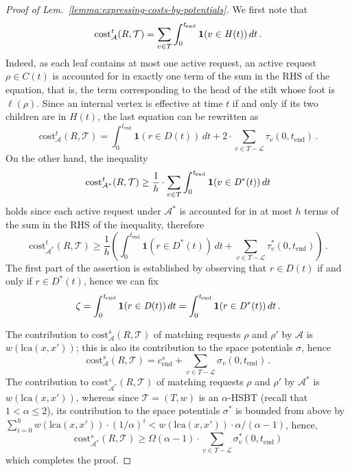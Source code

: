 \documentclass[11pt]{article}
\theoremstyle{definition}
\theoremstyle{plain}
\theoremstyle{definition}
\theoremstyle{plain}
\theoremstyle{definition}
\theoremstyle{plain}
\newenvironment{MathMaybe}[0]
{\begin{displaymath}\ignorespaces}
{\end{displaymath}\ignorespacesafterend}
\newenvironment{MathMaybe}[0]
{\begin{math}\ignorespaces}
{\end{math}}
\newcommand{\Lem}{Lem.}
\newcommand{\Location}{\ell}
\newcommand{\sCost}{\mathrm{cost}^{\mathit{s}}}
\newcommand{\tCost}{\mathrm{cost}^{\mathit{t}}}
\newcommand{\Leaves}{\mathcal{L}}
\newcommand{\LCA}{\mathrm{lca}}
\newcommand{\Indicator}{\mathbf{1}}
\newcommand{\EndTime}{\mathit{t}_{\mathrm{end}}}
\newcommand{\sEndCost}{\mathit{c}_{\mathrm{end}}^{\mathit{s}}}
\newcommand{\Active}{\mathit{C}}
\newcommand{\Odd}{\mathit{D}}
\newcommand{\Heads}{\mathit{H}}
\newcommand{\A}{\mathcal{A}}
\newcommand{\adv}[1]{{#1}^{*}}
\begin{document}
\begin{proof}[Proof of \Lem{}~\ref{lemma:expressing-costs-by-potentials}]
We first note that
\begin{MathMaybe}
\tCost_{\A}(R, \mathcal{T})
=
\sum_{v \in T} \int_{0}^{\EndTime} \Indicator(v \in \Heads(t)) \, d t \, .
\end{MathMaybe}
Indeed, as each leaf contains at most one active request, an active request
$\rho \in \Active(t)$ is accounted for in exactly one term of the sum in the
RHS of the equation, that is, the term corresponding to the head
of the stilt whose foot is $\Location(\rho)$.
Since an internal vertex is effective at time $t$ if and only if its two
children are in $\Heads(t)$, the last equation can be rewritten as
\[
\tCost_{\A}(R, \mathcal{T})
=
\int_{0}^{\EndTime} \Indicator(r \in \Odd(t)) \, d t
+
2 \cdot \sum_{v \in T - \Leaves} \tau_{v}(0, \EndTime) \, .
\]
On the other hand, the inequality
\begin{MathMaybe}
\tCost_{\adv{\A}}(R, \mathcal{T})
\geq
\frac{1}{h} \cdot \sum_{v \in T} \int_{0}^{\EndTime} \Indicator(v \in
\adv{\Odd}(t)) \, d t
\end{MathMaybe}
holds since each active request under $\adv{\A}$ is accounted for in at
most $h$ terms of the sum in the RHS of the inequality, therefore
\[
\tCost_{\adv{\A}}(R, \mathcal{T})
\geq
\frac{1}{h} \left(
\int_{0}^{\EndTime} \Indicator(r \in \adv{\Odd}(t)) \, d t
+
\sum_{v \in T - \Leaves} \adv{\tau}_{v}(0, \EndTime)
\right) \, .
\]
The first part of the assertion is established by observing that
$r \in \Odd(t)$
if and only if
$r \in \adv{\Odd}(t)$,
hence we can fix
\begin{MathMaybe}
\zeta
=
\int_{0}^{\EndTime} \Indicator(r \in \Odd(t)) \, d t
=
\int_{0}^{\EndTime} \Indicator(r \in \adv{\Odd}(t)) \, d t \, .
\end{MathMaybe}

The contribution to $\sCost_{\A}(R, \mathcal{T})$ of matching requests $\rho$
and $\rho'$ by $\A$ is $w(\LCA(x, x'))$;
this is also its contribution to the space potentials $\sigma$, hence
\[
\sCost_{\A}(R, \mathcal{T})
=
\sEndCost
+
\sum_{v \in T - \Leaves} \sigma_{v}(0, \EndTime) \, .
\]
The contribution to
$\sCost_{\adv{\A}}(R, \mathcal{T})$
of matching requests $\rho$ and $\rho'$ by $\adv{\A}$ is $w(\LCA(x, x'))$,
whereas since
$\mathcal{T} = (T, w)$
is an $\alpha$-HSBT (recall that
$1 < \alpha \leq 2$),
its contribution to the space potentials $\adv{\sigma}$ is bounded
from above by
$\sum_{i = 0}^{h} w(\LCA(x, x')) \cdot (1 / \alpha)^{i}
<
w(\LCA(x, x')) \cdot \alpha / (\alpha - 1)$,
hence,
\[
\sCost_{\adv{\A}}(R, \mathcal{T})
\geq
\Omega (\alpha - 1) \cdot \sum_{v \in T - \Leaves}
\adv{\sigma}_{v}(0, \EndTime)
\]
which completes the proof.
\end{proof}
\end{document}
